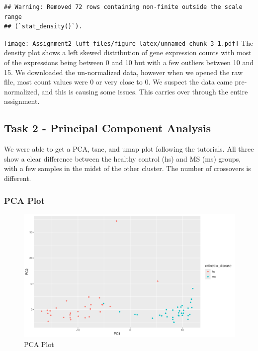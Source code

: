 \documentclass[
]{article}
\begin{document}
\begin{verbatim}
## Warning: Removed 72 rows containing non-finite outside the scale range
## (`stat_density()`).
\end{verbatim}

\texttt{[image: Assignment2\_luft\_files/figure-latex/unnamed-chunk-3-1.pdf]}
The density plot shows a left skewed distribution of gene expression
counts with most of the expressions being between 0 and 10 but with a
few outliers between 10 and 15. We downloaded the un-normalized data,
however when we opened the raw file, most count values were 0 or very
close to 0. We suspect the data came pre-normalized, and this is causing
some issues. This carries over through the entire assignment.

\subsection{Task 2 - Principal Component
Analysis}\label{task-2---principal-component-analysis}

We were able to get a PCA, tsne, and umap plot following the tutorials.
All three show a clear difference between the healthy control (hs) and
MS (ms) groups, with a few samples in the midst of the other cluster.
The number of crossovers is different.

\subsubsection{PCA Plot}\label{pca-plot}

\begin{figure}
\centering
\includegraphics{../../plots/SRP164913_pca_plot.png}
\caption{PCA Plot}
\end{figure}

\newpage
\end{document}
